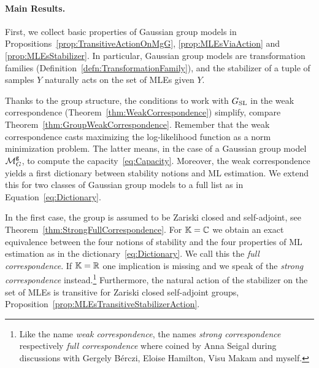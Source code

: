 


\paragraph{Main Results.} 

First, we collect basic properties of Gaussian group models in Propositions~\ref{prop:TransitiveActionOnMgG}, \ref{prop:MLEsViaAction} and \ref{prop:MLEsStabilizer}. In particular, Gaussian group models are transformation families (Definition~\ref{defn:TransformationFamily}), and the stabilizer of a tuple of samples $Y$ naturally acts on the set of MLEs given $Y$.

Thanks to the group structure, the conditions to work with $G_{\operatorname{SL}}$ in the weak correspondence (Theorem~\ref{thm:WeakCorrespondence}) simplify, compare Theorem~\ref{thm:GroupWeakCorrespondence}.
Remember that the weak correspondence casts maximizing the log-likelihood function as a norm minimization problem. The latter means, in the case of a Gaussian group model $\mathcal{M}^{\mathtt{g}}_G$, to compute the capacity~\eqref{eq:Capacity}.
Moreover, the weak correspondence yields a first dictionary between stability notions and ML estimation.
We extend this for two classes of Gaussian group models to a full list as in Equation~\eqref{eq:Dictionary}.

In the first case, the group is assumed to be Zariski closed and self-adjoint, see Theorem~\ref{thm:StrongFullCorrespondence}. For $\mathbb K = \mathbb C$ we obtain an exact equivalence between the four notions of stability and the four properties of ML estimation as in the dictionary~\eqref{eq:Dictionary}. We call this the \emph{full correspondence}. If $\mathbb K = \mathbb R$ one implication is missing and we speak of the \emph{strong correspondence} instead.\footnote{Like the name \emph{weak correspondence}, the names \emph{strong correspondence} respectively \emph{full correspondence} where coined by Anna Seigal during discussions with Gergely B\'erczi, Eloise Hamilton, Visu Makam and myself.}
Furthermore, the natural action of the stabilizer on the set of MLEs is transitive for Zariski closed self-adjoint groups, Proposition~\ref{prop:MLEsTransitiveStabilizerAction}. 

